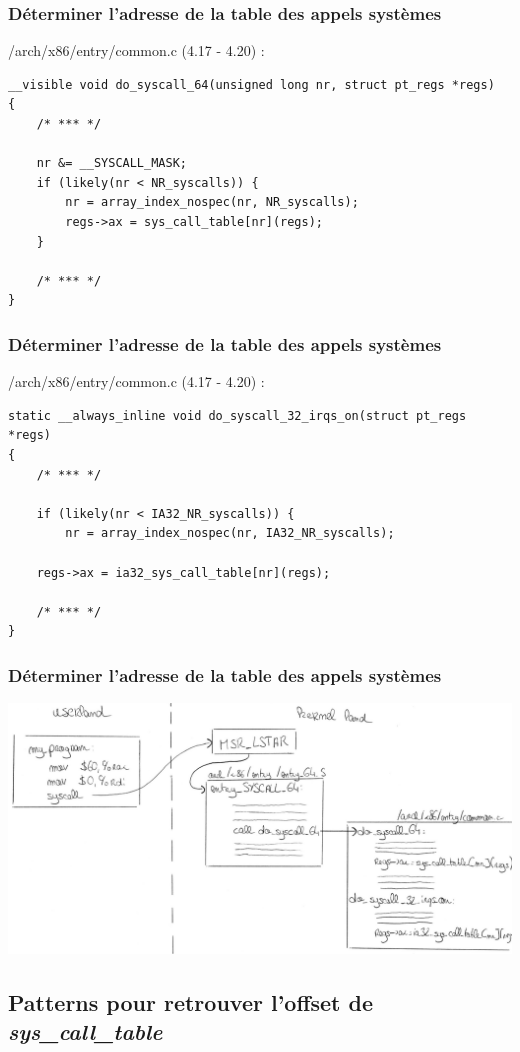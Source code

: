 \documentclass{beamer}
\begin{document}
\begin{frame}[fragile]
\frametitle{Déterminer l'adresse de la table des appels systèmes}
/arch/x86/entry/common.c (4.17 - 4.20) :
\begin{lstlisting}[style=CStyle]
__visible void do_syscall_64(unsigned long nr, struct pt_regs *regs)
{
	/* *** */

	nr &= __SYSCALL_MASK;
	if (likely(nr < NR_syscalls)) {
		nr = array_index_nospec(nr, NR_syscalls);
		regs->ax = sys_call_table[nr](regs);
	}

	/* *** */
}
\end{lstlisting}
\end{frame}

\begin{frame}[fragile]
\frametitle{Déterminer l'adresse de la table des appels systèmes}
/arch/x86/entry/common.c (4.17 - 4.20) :
\begin{lstlisting}[style=CStyle]
static __always_inline void do_syscall_32_irqs_on(struct pt_regs *regs)
{
	/* *** */

	if (likely(nr < IA32_NR_syscalls)) {
		nr = array_index_nospec(nr, IA32_NR_syscalls);

	regs->ax = ia32_sys_call_table[nr](regs);

	/* *** */
}
\end{lstlisting}
\end{frame}

\begin{frame}
\frametitle{Déterminer l'adresse de la table des appels systèmes}
\includegraphics[scale=0.43]{figure}
\end{frame}

\subsection{Patterns pour retrouver l'offset de \textit{sys\_call\_table}}
\end{document}
